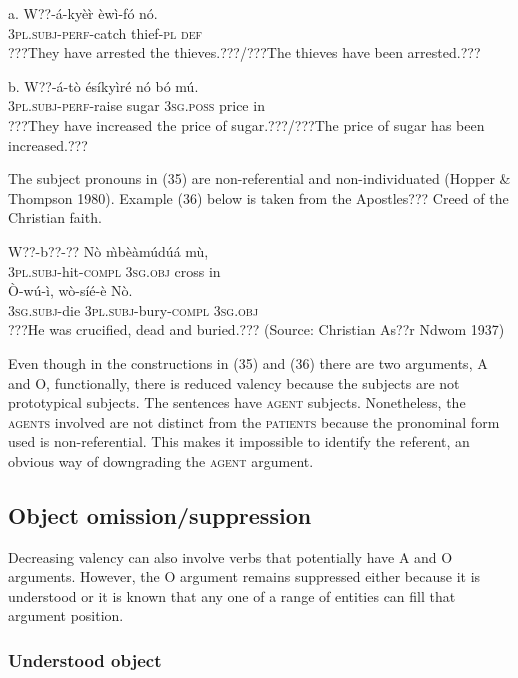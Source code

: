 \documentclass[output=paper]{langsci/langscibook}
\begin{document}
\ea
\gll a.  W??-á-kyè\`{r}    èwì-fó    nó.\\
       \textsc{3pl.subj}{}-\textsc{perf}{}-catch  thief-\textsc{pl}  \textsc{def}\\
\glt ???They have arrested the thieves.???/???The thieves have been arrested.???
\z

\ea
\gll  b.  W??-á-tò    ésíkyìré  nó    bó  mú.\\
       \textsc{3pl.subj}{}-\textsc{perf}{}-raise  sugar    \textsc{3sg.poss}  price  in\\
\glt   ???They have increased the price of sugar.???/???The price of sugar has been increased.???
\z

The subject pronouns in (35) are non-referential and non-individuated (Hopper \& Thompson 1980). Example (36) below is taken from the Apostles??? Creed of the Christian faith. 

\ea
\gll W??-b??-??       Nò    \`{m}bèàmúdúá  m\`{u}, \\
     \textsc{3pl.subj}{}-hit\textsc{{}-compl}  \textsc{3sg.obj}  cross    in\\
\gll \`{O}-wú-ì,     wò-síé-è     Nò.\\
     \textsc{3sg.subj}{}-die  \textsc{3pl.subj}{}-bury\textsc{{}-compl}  \textsc{3sg.obj}\\
\glt ???He was crucified, dead and buried.??? (Source: Christian As??r Ndwom 1937)
\z

Even though in the constructions in (35) and (36) there are two arguments, A and O, functionally, there is reduced valency because the subjects are not prototypical subjects. The sentences have \textsc{agent} subjects. Nonetheless, the \textsc{agents} involved are not distinct from the \textsc{patients} because the pronominal form used is non-referential. This makes it impossible to identify the referent, an obvious way of downgrading the \textsc{agent} argument.

\subsection{Object omission/suppression }

Decreasing valency can also involve verbs that potentially have A and O arguments. However, the O argument remains suppressed either because it is understood or it is known that any one of a range of entities can fill that argument position.

\subsubsection{Understood object}
\end{document}
